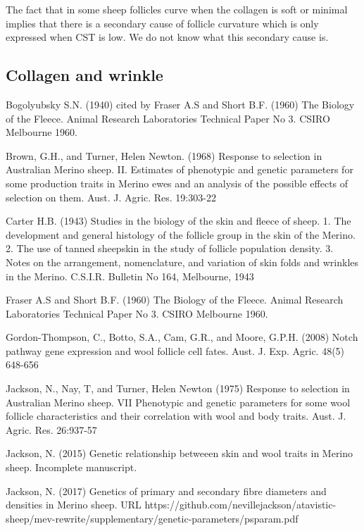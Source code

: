 \documentclass[titlepage]{article}  %
\begin{document}
The fact that in some sheep follicles curve when the collagen is soft or minimal implies that there is a secondary cause of follicle curvature which is only expressed when CST is low. We do not know what this secondary cause is. 

\subsection{Collagen and wrinkle}


\clearpage
\begin{thebibliography}{99}

 Bogolyubsky S.N. (1940) cited by Fraser A.S and Short B.F. (1960) The Biology of the Fleece. Animal Research Laboratories Technical Paper No 3. CSIRO Melbourne 1960.

Brown, G.H., and Turner, Helen Newton. (1968) Response to selection in Australian Merino sheep. II. Estimates of phenotypic and genetic parameters for some production traits in Merino ewes and an analysis of the possible effects of selection on them. Aust. J. Agric. Res. 19:303-22

Carter H.B. (1943) Studies in the biology of the skin and fleece of sheep. 1. The development and general histology of the follicle group in the skin of the Merino. 2. The use of tanned sheepskin in the study of follicle population density. 3. Notes on the arrangement, nomenclature, and variation of skin folds and wrinkles in the Merino. C.S.I.R. Bulletin No 164, Melbourne, 1943

Fraser A.S and Short B.F. (1960) The Biology of the Fleece. Animal Research Laboratories Technical Paper No 3. CSIRO Melbourne 1960.

Gordon-Thompson, C., Botto, S.A., Cam, G.R., and Moore, G.P.H. (2008) Notch pathway gene expression and wool follicle cell fates. Aust. J. Exp. Agric. 48(5) 648-656

Jackson, N., Nay, T, and Turner, Helen Newton (1975) Response to selection in Australian Merino sheep. VII Phenotypic and genetic parameters for some wool follicle characteristics and their correlation with wool and body traits. Aust. J. Agric. Res. 26:937-57

Jackson, N. (2015) Genetic relationship betweeen skin and wool traits in Merino sheep. Incomplete manuscript.

Jackson, N. (2017) Genetics of primary and secondary fibre diameters and densities in Merino sheep. URL https://github.com/nevillejackson/atavistic-sheep/mev-rewrite/supplementary/genetic-parameters/psparam.pdf


\end{thebibliography}
\end{document}
